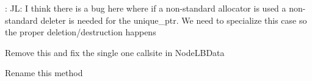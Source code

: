 
\begin{DoxyRefList}
\item[Member \mbox{\hyperlink{namespacecheckpoint_1_1dispatch_ab8c128a7c30a68f6686be79e8181aba2}{checkpoint::dispatch::deserialize\+Type}} (Serial\+Byte\+Type $\ast$data, Serial\+Byte\+Type $\ast$alloc\+Buf)]\label{todo__todo000003}%
%
\+: JL\+: I think there is a bug here where if a non-\/standard allocator is used a non-\/standard deleter is needed for the unique\+\_\+ptr. We need to specialize this case so the proper deletion/destruction happens  
\item[Member \mbox{\hyperlink{structvt_1_1runtime_1_1_runtime_a34252fc839ea767c8fca1efb97918385}{vt::runtime::Runtime::system\+Sync}} ()]\label{todo__todo000001}%
%
Remove this and fix the single one callsite in {\ttfamily Node\+L\+B\+Data}  
\item[Member \mbox{\hyperlink{structvt_1_1vrt_1_1collection_1_1_holder_a46a48d80d10924fbb928f4267a83c441}{vt::vrt::collection::Holder$<$ IndexT $>$::cleanup\+Exists}} ()]\label{todo__todo000002}%
%
Rename this method
\end{DoxyRefList}
